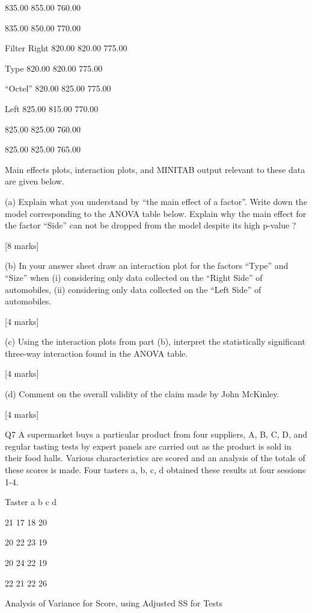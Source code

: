 835.00 855.00 760.00

835.00 850.00 770.00

Filter Right 820.00 820.00 775.00

Type 820.00 820.00 775.00

“Octel” 820.00 825.00 775.00

Left 825.00 815.00 770.00

825.00 825.00 760.00

825.00 825.00 765.00

Main effects plots, interaction plots, and MINITAB output relevant to these data are given below.

(a) Explain what you understand by “the main effect of a factor”. Write down the model corresponding to the ANOVA table below. Explain why the main effect for the factor “Side” can not be dropped from the model despite its high p-value ?

[8 marks]

(b) In your answer sheet draw an interaction plot for the factors “Type” and “Size” when (i) considering only data collected on the “Right Side” of automobiles, (ii) considering only data collected on the “Left Side” of automobiles.

[4 marks]

(c) Using the interaction plots from part (b), interpret the statistically significant three-way interaction found in the ANOVA table.

[4 marks]

(d) Comment on the overall validity of the claim made by John McKinley.

[4 marks]



Q7 A supermarket buys a particular product from four suppliers, A, B, C, D, and regular tasting tests by expert panels 
are carried out as the product is sold in their food halls. 
Various characteristics are scored and an analysis of the totals of these scores is made. 
Four tasters a, b, c, d obtained these results at four sessions 1-4.

Taster a b c d

21 17 18 20

20 22 23 19

20 24 22 19

22 21 22 26



Analysis of Variance for Score, using Adjusted SS for Tests

